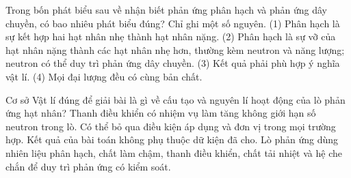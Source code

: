 \begin{ex}
Trong bốn phát biểu sau về nhận biết phản ứng phân hạch và phản ứng dây chuyền, có bao nhiêu phát biểu đúng? Chỉ ghi một số nguyên. (1) Phân hạch là sự kết hợp hai hạt nhân nhẹ thành hạt nhân nặng. (2) Phân hạch là sự vỡ của hạt nhân nặng thành các hạt nhân nhẹ hơn, thường kèm neutron và năng lượng; neutron có thể duy trì phản ứng dây chuyền. (3) Kết quả phải phù hợp ý nghĩa vật lí. (4) Mọi đại lượng đều có cùng bản chất.
\end{ex}

\begin{ex}
Cơ sở Vật lí đúng để giải bài là gì về cấu tạo và nguyên lí hoạt động của lò phản ứng hạt nhân?
\choice
{Thanh điều khiển có nhiệm vụ làm tăng không giới hạn số neutron trong lò.}
{Có thể bỏ qua điều kiện áp dụng và đơn vị trong mọi trường hợp.}
{Kết quả của bài toán không phụ thuộc dữ kiện đã cho.}
{\True Lò phản ứng dùng nhiên liệu phân hạch, chất làm chậm, thanh điều khiển, chất tải nhiệt và hệ che chắn để duy trì phản ứng có kiểm soát.}
\end{ex}

